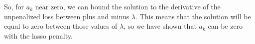 \documentclass[11pt]{article}
\begin{document}
\vspace{5mm}
\noindent
So, for $a_{k}$ near zero, we can bound the solution to the derivative of the 
unpenalized loss between plus and minus $\lambda$. This means that the solution 
will be equal to zero between those values of $\lambda$, so we have shown that 
$a_{k}$ can be zero with the lasso penalty.
\end{document}
